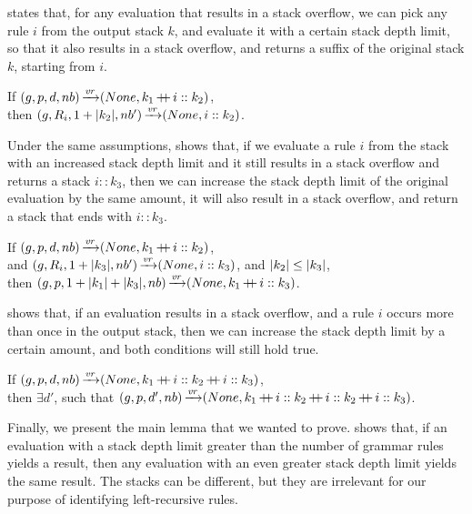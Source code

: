  states that,
for any evaluation that results in a stack overflow,
we can pick any rule $i$ from the output stack $k$,
and evaluate it with a certain stack depth limit,
so that it also results in a stack overflow,
and returns a suffix of the original stack $k$,
starting from $i$.

\begin{lemma}%
    If $(g,p,d,nb) \operatorname{\xrightarrow{\mathit{vr}}} (None,k_1 \operatorname{+\kern -0.4em+} i :: k_2)$, \\
    then $(g,R_{i},1+|k_2|,nb') \operatorname{\xrightarrow{\mathit{vr}}} (None,i :: k_2)$.
    \label{lemma:ff-for-lr-patterns}
\end{lemma}

Under the same assumptions,
 shows that,
if we evaluate a rule $i$ from the stack
with an increased stack depth limit
and it still results in a stack overflow
and returns a stack $i :: k_3$,
then we can increase the stack depth limit
of the original evaluation by the same amount,
it will also result in a stack overflow,
and return a stack that ends with $i :: k_3$.

\begin{lemma}%
    If $(g,p,d,nb) \operatorname{\xrightarrow{\mathit{vr}}} (None,k_1 \operatorname{+\kern -0.4em+} i :: k_2)$, \\
    and $(g,R_{i},1+|k_3|,nb') \operatorname{\xrightarrow{\mathit{vr}}} (None,i :: k_3)$,
    and $|k_2| \le |k_3|$, \\
    then $(g,p,1 + |k_1| + |k_3|,nb) \operatorname{\xrightarrow{\mathit{vr}}} (None,k_1 \operatorname{+\kern -0.4em+} i :: k_3)$.
    \label{lemma:d-increase-lr}
\end{lemma}

 shows that,
if an evaluation results in a stack overflow,
and a rule $i$ occurs more than once in the output stack,
then we can increase the stack depth limit by a certain amount,
and both conditions will still hold true.

\begin{lemma}%
    If $(g,p,d,nb) \operatorname{\xrightarrow{\mathit{vr}}} (None,k_1 \operatorname{+\kern -0.4em+} i :: k_2 \operatorname{+\kern -0.4em+} i :: k_3)$, \\
    then $\exists d'$,
    such that $(g,p,d',nb) \operatorname{\xrightarrow{\mathit{vr}}} (None,k_1 \operatorname{+\kern -0.4em+} i :: k_2 \operatorname{+\kern -0.4em+} i :: k_2 \operatorname{+\kern -0.4em+} i :: k_3)$.
    \label{lemma:repeated-rule-in-stack}
\end{lemma}

Finally, we present the main lemma
that we wanted to prove.
shows that,
if an evaluation with a stack depth limit
greater than the number of grammar rules
yields a result,
then any evaluation with an even greater stack depth limit
yields the same result.
The stacks can be different,
but they are irrelevant
for our purpose of identifying
left-recursive rules.


